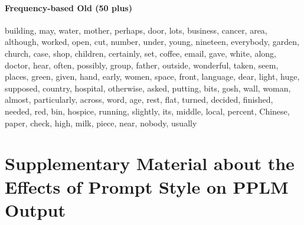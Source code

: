 \paragraph{Frequency-based Old (50 plus)} building, may, water, mother, perhaps, door, lots, business, cancer, area, although, worked, open, cut, number, under, young, nineteen, everybody, garden, church, case, shop, children, certainly, set, coffee, email, gave, white, along, doctor, hear, often, possibly, group, father, outside, wonderful, taken, seem, places, green, given, hand, early, women, space, front, language, dear, light, huge, supposed, country, hospital, otherwise, asked, putting, bits, gosh, wall, woman, almost, particularly, across, word, age, rest, flat, turned, decided, finished, needed, red, bin, hospice, running, slightly, its, middle, local, percent, Chinese, paper, check, high, milk, piece, near, nobody, usually

\section{Supplementary Material about the Effects of Prompt Style on PPLM Output}


